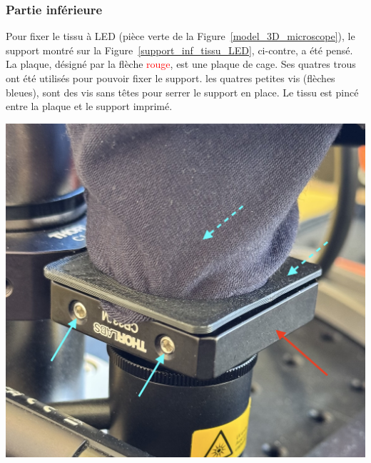 \subsubsection{Partie inférieure}
\begin{minipage}[c]{0.38\textwidth}
    Pour fixer le tissu à LED (pièce \textcolor[RGB]{70, 170, 70}{verte} de la Figure~\ref{model_3D_microscope}), le support montré sur la Figure~\ref{support_inf_tissu_LED}, ci-contre, a été pensé. La plaque, désigné par la flèche \textcolor{red}{rouge}, est une plaque de cage. Ses quatres trous ont été utilisés pour pouvoir fixer le support. les quatres petites vis (flèches \textcolor[RGB]{115, 210, 210}{bleues}), sont des vis sans têtes pour serrer le support en place. Le tissu est pincé entre la plaque et le support imprimé.
\end{minipage}\hfill
\begin{minipage}[c]{0.58\textwidth}
    \begin{center}
        \includegraphics[width=\textwidth]{assets/figures/Protections_laser/Securite_mecanique/Protection_vers_microscope/support_inf_tissu_LED.jpeg}
    \end{center}
    \label{support_inf_tissu_LED}
\end{minipage}

